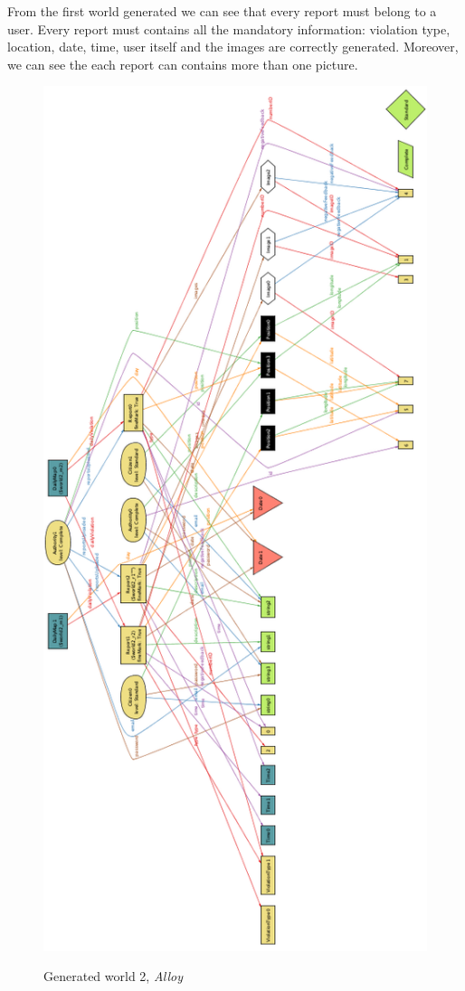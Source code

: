 \documentclass[../RASD.tex]{subfiles}
\begin{document}
    From the first world generated we can see that every report must belong to a user.
    Every report must contains all the mandatory information: violation type, location, date, time, user itself and the images are correctly generated.
    Moreover, we can see the each report can contains more than one picture.

    \begin{figure}[H]
        \centering
        \includegraphics[scale = 0.95]{assets/world2.png}\\[1.6 cm]
        \caption[Generated world 2, \textit{Alloy}]{Generated world 2, \textit{Alloy}}
    \end{figure}
\end{document}
